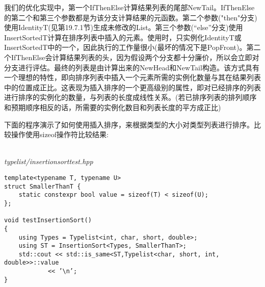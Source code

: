 我们的优化实现中，第一个IfThenElse计算结果列表的尾部NewTail。IfThenElse的第二个和第三个参数都是为该分支计算结果的元函数。第二个参数("then"分支)使用IdentityT(见第19.7.1节)生成未修改的List。第三个参数(“else”分支)使用InsertSortedT计算在排序列表中插入的元素。使用时，只实例化IdentityT或InsertSortedT中的一个，因此执行的工作量很小(最坏的情况下是PopFront)。第二个IfThenElse会计算结果列表的头，因为假设两个分支都十分廉价，所以会立即对分支进行评估。最终的列表是由计算出来的NewHead和NewTail构造。该方式具有一个理想的特性，即向排序列表中插入一个元素所需的实例化数量与其在结果列表中的位置成正比。这表现为插入排序的一个更高级别的属性，即对已经排序的列表进行排序的实例化的数量，与列表的长度成线性关系。(若已排序列表的排列顺序和预期顺序相反的话，所需要的实例化数目和列表长度的平方成正比)

下面的程序演示了如何使用插入排序，来根据类型的大小对类型列表进行排序。比较操作使用sizeof操作符比较结果:

\hspace*{\fill} \\ %
\noindent
\textit{typelist/insertionsorttest.hpp}
\begin{lstlisting}[style=styleCXX]
template<typename T, typename U>
struct SmallerThanT {
	static constexpr bool value = sizeof(T) < sizeof(U);
};

void testInsertionSort()
{
	using Types = Typelist<int, char, short, double>;
	using ST = InsertionSort<Types, SmallerThanT>;
	std::cout << std::is_same<ST,Typelist<char, short, int, double>>::value
			<< ’\n’;
}
\end{lstlisting}

























